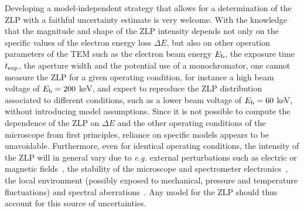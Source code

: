Developing a model-independent strategy that allows for a determination of the ZLP
with a faithful uncertainty estimate is very welcome.
%
With the knowledge that the magnitude and shape of the ZLP intensity depends
not only on the specific values
of the electron energy loss $\Delta E$, but also on other operation parameters
of the TEM such as the electron beam energy $E_{\rm b}$, the exposure time
$t_{\rm exp}$, the aperture width and the potential use of a monochromator,
one cannot measure the ZLP for a given operating
condition, for instance a high beam voltage of $E_{\rm b}=200$ keV, and expect to reproduce
the ZLP distribution
associated to different conditions, such as a lower beam voltage of $E_{\rm b}=60$ keV,
without introducing model assumptions.
%
Since it is not possible to compute the dependence of the ZLP on $\Delta E$
and the other operating conditions of the microscope from first principles,
reliance on specific models appears to be unavoidable.
%
Furthermore, even for identical operating conditions, 
the intensity of the ZLP will in general vary due to {\it e.g.} external perturbations 
such as electric or magnetic fields~\cite{Rafferty:2000},
the stability of the microscope and spectrometer electronics~\cite{Kothleitner:2003}, 
the local environment (possibly exposed to mechanical, pressure and temperature fluctuations) 
and spectral aberrations~\cite{Egerton:1996}. 
%
Any model for the ZLP should thus account for this source of uncertainties.

